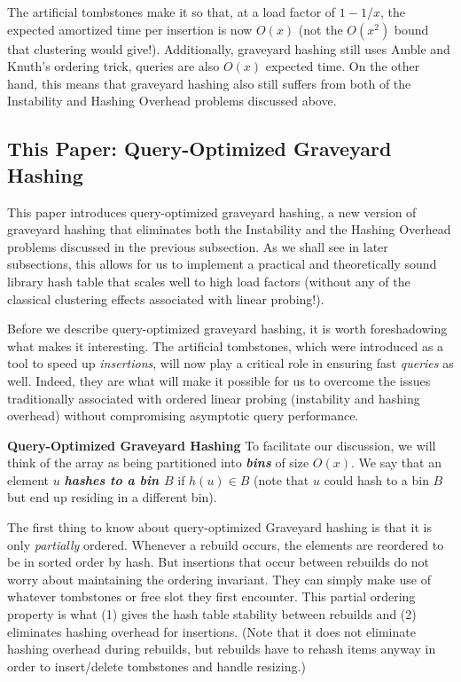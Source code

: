 \documentclass[10pt]{article}
\theoremstyle{remark}
\theoremstyle{remark}
\newcommand{\defn}[1]{\textbf{\emph{#1}}}
\renewcommand{\paragraph}[1]{\vspace{.2 cm} \noindent \textbf{#1}}
\begin{document}
The artificial tombstones make it so that, at a load factor of $1- 1/x$, the expected amortized time per insertion is now $O(x)$ (not the $O(x^2)$ bound that clustering would give!). Additionally, graveyard hashing still uses Amble and Knuth's ordering trick, queries are also $O(x)$ expected time. On the other hand, this means that graveyard hashing also still suffers from both of the Instability and Hashing Overhead problems discussed above.

\subsection{This Paper: Query-Optimized Graveyard Hashing}

This paper introduces query-optimized graveyard hashing, a new version of graveyard hashing that eliminates both the Instability and the Hashing Overhead problems discussed in the previous subsection. As we shall see in later subsections, this allows for us to implement a practical and theoretically sound library hash table that scales well to high load factors (without any of the classical clustering effects associated with linear probing!).

Before we describe query-optimized graveyard hashing, it is worth foreshadowing what makes it interesting. The artificial tombstones, which were introduced as a tool to speed up \emph{insertions}, will now play a critical role in ensuring fast \emph{queries} as well. Indeed, they are what will make it possible for us to overcome the issues traditionally associated with ordered linear probing (instability and hashing overhead) without compromising asymptotic query performance.

\paragraph{Query-Optimized Graveyard Hashing}
To facilitate our discussion, we will think of the array as being partitioned into \defn{bins} of size $O(x)$. We say that an element $u$ \defn{hashes to a bin $B$} if $h(u) \in B$ (note that $u$ could hash to a bin $B$ but end up residing in a different bin). 

The first thing to know about query-optimized Graveyard hashing is that it is only \emph{partially} ordered. Whenever a rebuild occurs, the elements are reordered to be in sorted order by hash. But insertions that occur between rebuilds do not worry about maintaining the ordering invariant. They can simply make use of whatever tombstones or free slot they first encounter. This partial ordering property is what (1) gives the hash table stability between rebuilds and (2) eliminates hashing overhead for insertions. (Note that it does not eliminate hashing overhead during rebuilds, but rebuilds have to rehash items anyway in order to insert/delete tombstones and handle resizing.)
\end{document}
